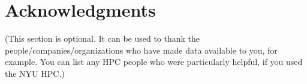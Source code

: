 \documentclass[letterpaper,twocolumn,10pt]{article}
\begin{document}
%
%
%
%
%
%
%
%

\section{Acknowledgments}

(This section is optional. It can be used to thank the  people/companies/organizations who have made data available to you, for example. You can list any HPC people who were particularly helpful, if you used the NYU HPC.)


 
 
\end{document}
